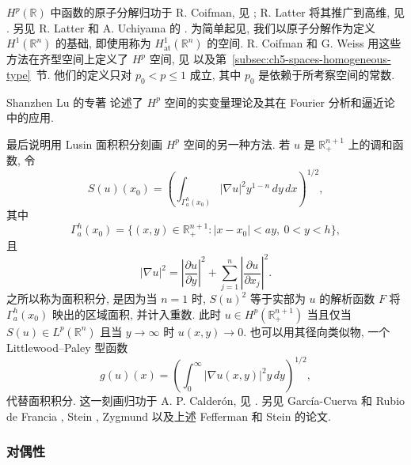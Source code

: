 \hypertarget{chapter-06-page-140}{}
$H^p(\mathbb R)$ 中函数的原子分解归功于 R. Coifman, 见 ; R. Latter 将其推广到高维, 见 . 另见 R. Latter 和 A. Uchiyama 的 . 为简单起见, 我们以原子分解作为定义 $H^1(\mathbb R^n)$ 的基础, 即使用称为 $H^1_{\mathrm{at}}(\mathbb R^n)$ 的空间. R. Coifman 和 G. Weiss 用这些方法在齐型空间上定义了 $H^p$ 空间, 见  以及第~\ref{subsec:ch5-spaces-homogeneous-type}~节. 他们的定义只对 $p_0<p\le1$ 成立, 其中 $p_0$ 是依赖于所考察空间的常数.

Shanzhen Lu 的专著  论述了 $H^p$ 空间的实变量理论及其在 Fourier 分析和逼近论中的应用.

最后说明用 Lusin 面积积分刻画 $H^p$ 空间的另一种方法. 若 $u$ 是 $\mathbb R_+^{n+1}$ 上的调和函数, 令
\[
 S(u)(x_0)=\left(\int_{\Gamma_a^h(x_0)}|\nabla u|^2y^{1-n}\,dy\,dx\right)^{1/2},
\]
其中
\[
 \Gamma_a^h(x_0)=\{(x,y)\in\mathbb R_+^{n+1}:|x-x_0|<ay,\ 0<y<h\},
\]
且
\[
 |\nabla u|^2=\left|\frac{\partial u}{\partial y}\right|^2
 +\sum_{j=1}^n\left|\frac{\partial u}{\partial x_j}\right|^2.
\]
之所以称为面积积分, 是因为当 $n=1$ 时, $S(u)^2$ 等于实部为 $u$ 的解析函数 $F$ 将 $\Gamma_a^h(x_0)$ 映出的区域面积, 并计入重数. 此时 $u\in H^p(\mathbb R_+^{n+1})$ 当且仅当 $S(u)\in L^p(\mathbb R^n)$ 且当 $y\to\infty$ 时 $u(x,y)\to0$. 也可以用其径向类似物, 一个 Littlewood--Paley 型函数
\[
 g(u)(x)=\left(\int_0^\infty|\nabla u(x,y)|^2y\,dy\right)^{1/2},
\]
代替面积积分. 这一刻画归功于 A. P. Calderón, 见 . 另见 García-Cuerva 和 Rubio de Francia , Stein , Zygmund  以及上述 Fefferman 和 Stein 的论文.

\hypertarget{chapter-06-page-141}{}
\subsubsection{对偶性}
\label{subsec:ch6-duality}

